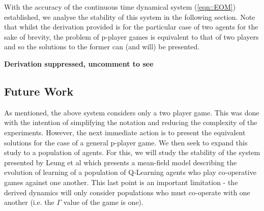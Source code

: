\documentclass[.../main.tex]{subfiles}
\begin{document}
    With the accuracy of the continuous time dynamical system (\ref{eqn::EOM}) established, we analyse the
    stability of this system in the following section. Note that whilst the derivation provided is
    for the particular case of two agents for the sake of brevity, the problem of p-player games is
    equivalent to that of two players and so the solutions to the former can (and will) be
    presented. 

     \textbf{Derivation suppressed, uncomment to see}
    
    \subsection*{Future Work} \label{sec::Future Work}

    As mentioned, the above system considers only a two player game. This was done with the intention
    of simplifying the notation and reducing the complexity of the experiments. However, the next
    immediate action is to present the equivalent solutions for the case of a general p-player game.
    We then seek to expand this study to a population of agents. For this, we will study the
    stability of the system presented by Leung et al \cite{Hu2019} which presents a mean-field model
    describing the evolution of learning of a population of Q-Learning agents who play co-operative
    games against one another. This last point is an important limitation - the derived dynamics
    will only consider populations who must co-operate with one another (i.e. the $\Gamma$ value of
    the game is one). 
\end{document}
